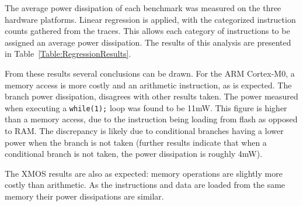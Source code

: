 \documentclass[twocolumn]{article}
\begin{document}

The average power dissipation of each benchmark was measured on the three hardware platforms. Linear regression is applied, with the categorized instruction counts gathered from the traces. This allows each category of instructions to be assigned an average power dissipation. The results of this analysis are presented in Table~\ref{Table:RegressionResults}.

From these results several conclusions can be drawn. For the ARM Cortex-M0, a memory access is more costly and an arithmetic instruction, as is expected. The branch power dissipation, disagrees with other results taken. The power measured when executing a \texttt{while(1);} loop was found to be 11mW. This figure is higher than a memory access, due to the instruction being loading from flash as opposed to RAM. The discrepancy is likely due to conditional branches having a lower power when the branch is not taken (further results indicate that when a conditional branch is not taken, the power dissipation is roughly 4mW).

The XMOS results are also as expected: memory operations are slightly more costly than arithmetic. As the instructions and data are loaded from the same memory their power dissipations are similar.
\end{document}
